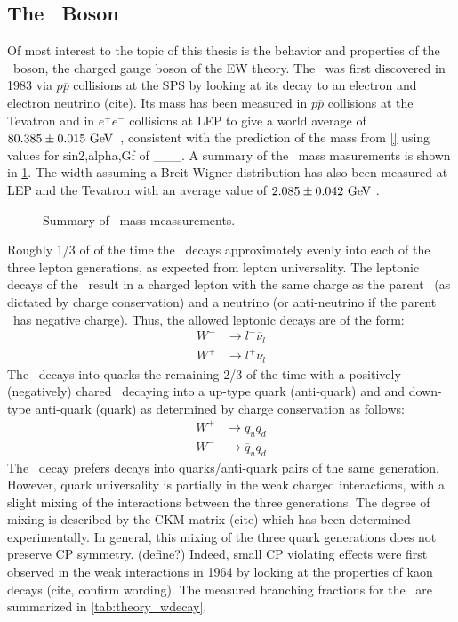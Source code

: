 \subsection{The \dubya~Boson}
Of most interest to the topic of this thesis is the behavior and properties
of the \dubya~boson, the charged gauge boson of the EW theory.
The \dubya~was first discovered in 1983 via $p\overline{p}$ collisions
at the SPS by looking at its decay to an electron %
and electron neutrino (cite).
Its mass has been measured in $p\overline{p}$ collisions at the Tevatron
and in $e^{+}e^{-}$ collisions at LEP to give a world 
average of $80.385 \pm 0.015\GeV$~\cite{PDG:2014}, consistent
with the prediction of the mass from \eqn\eqref{}
using values for sin2,alpha,Gf of \_\_\_.
A summary of the \dubya~mass masurements is shown in \fig\ref{fig:theory_wmass}.
The width assuming a Breit-Wigner distribution has also been measured 
at LEP and the Tevatron with an average value 
of $2.085\pm0.042\GeV$ \cite{PDG:2014}. %

\begin{figure}[ht]
\centering
\caption{Summary of \dubya~mass meassurements.}
\label{fig:theory_wmass}
\end{figure}

Roughly 1/3 of of the time the \dubya~decays approximately 
evenly into each of the three lepton generations,
as expected from lepton universality.
The leptonic decays of the \dubya~result in a charged lepton 
with the same charge as the parent \dubya~(as dictated by charge conservation)
and a neutrino (or anti-neutrino if the parent \dubya~has negative charge).
Thus, the allowed leptonic decays are of the form:
\begin{align*}
W^{-} &\rightarrow l^{-} \overline{\nu}_l \\
W^{+} &\rightarrow l^{+} \nu_l
\end{align*}
The \dubya~decays into quarks the remaining 2/3 of the time with a positively
(negatively) chared \dubya~decaying into a up-type quark (anti-quark) and 
and down-type anti-quark (quark) as determined by charge conservation as follows:
\begin{align*}
W^{+} &\rightarrow q_u \overline{q}_d \\
W^{-} &\rightarrow \overline{q}_u q_d
\end{align*}
The \dubya~decay prefers decays into quarks/anti-quark pairs of the same generation.
However, quark universality is partially in the weak charged interactions, with
a slight mixing of the interactions between the three generations. The 
degree of mixing is described by the CKM matrix (cite) which has been
determined experimentally.  In general, this mixing of the three quark 
generations does not preserve CP symmetry. (define?) Indeed, small CP
violating effects were first observed in the weak interactions in 1964
by looking at the properties of kaon decays (cite, confirm wording).
The measured branching fractions for the \dubya~are 
summarized in \tab\ref{tab:theory_wdecay}.


